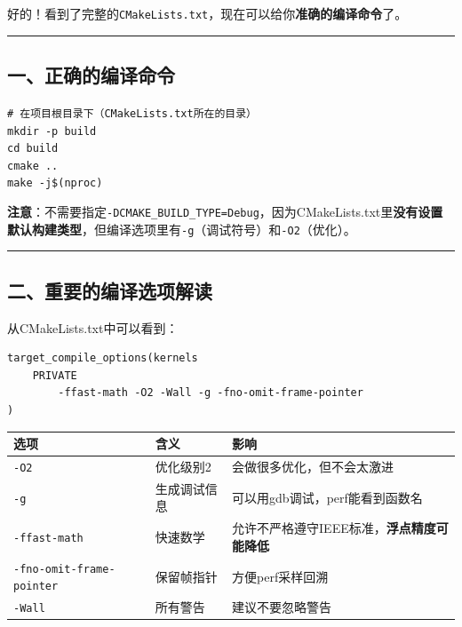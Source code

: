 \documentclass[11pt, a4paper]{article}
\begin{document}
\begin{aibox}
好的！看到了完整的\texttt{CMakeLists.txt}，现在可以给你\textbf{准确的编译命令}了。

\begin{center}\rule{\textwidth}{0.4pt}\end{center}

\subsection*{一、正确的编译命令}

\begin{tcolorbox}[colback=white,colframe=gray!50!white,boxrule=0.5pt,arc=2pt,left=5pt,right=5pt,top=5pt,bottom=5pt]
\texttt{\# 在项目根目录下（CMakeLists.txt所在的目录）}\\
\texttt{mkdir -p build}\\
\texttt{cd build}\\
\texttt{cmake ..}\\
\texttt{make -j\$(nproc)}
\end{tcolorbox}

\textbf{注意}：不需要指定\texttt{-DCMAKE\_BUILD\_TYPE=Debug}，因为CMakeLists.txt里\textbf{没有设置默认构建类型}，但编译选项里有\texttt{-g}（调试符号）和\texttt{-O2}（优化）。

\begin{center}\rule{\textwidth}{0.4pt}\end{center}

\subsection*{二、重要的编译选项解读}

从CMakeLists.txt中可以看到：

\begin{tcolorbox}[colback=white,colframe=gray!50!white,boxrule=0.5pt,arc=2pt,left=5pt,right=5pt,top=5pt,bottom=5pt]
\begin{verbatim}
target_compile_options(kernels
    PRIVATE
        -ffast-math -O2 -Wall -g -fno-omit-frame-pointer
)
\end{verbatim}
\end{tcolorbox}

\vspace{0.5em}
\begin{tabularx}{\textwidth}{@{} l l X @{}}
\toprule
选项 & 含义 & 影响 \\
\midrule
\texttt{-O2} & 优化级别2 & 会做很多优化，但不会太激进 \\
\texttt{-g} & 生成调试信息 & 可以用gdb调试，perf能看到函数名 \\
\texttt{-ffast-math} & 快速数学 & 允许不严格遵守IEEE标准，\textbf{浮点精度可能降低} \\
\texttt{-fno-omit-frame-pointer} & 保留帧指针 & 方便perf采样回溯 \\
\texttt{-Wall} & 所有警告 & 建议不要忽略警告 \\
\bottomrule
\end{tabularx}
\vspace{0.5em}


\end{aibox}
\end{document}
